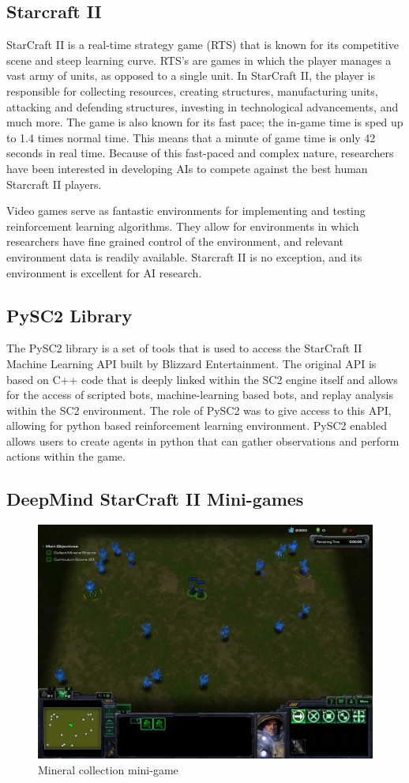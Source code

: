 \documentclass[12pt]{article}
\begin{document}
%
%
\subsection*{Starcraft II}

StarCraft II is a real-time strategy game (RTS) that is known for its competitive scene and steep learning curve.  RTS’s are games in which the player manages a vast army of units, as opposed to a single unit.  In StarCraft II, the player is responsible for collecting resources, creating structures, manufacturing units, attacking and defending structures, investing in technological advancements, and much more.  The game is also known for its fast pace; the in-game time is sped up to 1.4 times normal time.  This means that a minute of game time is only 42 seconds in real time.  Because of this fast-paced and complex nature, researchers have been interested in developing AIs to compete against the best human Starcraft II players.

Video games serve as fantastic environments for implementing and testing reinforcement learning algorithms.  They allow for environments in which researchers have fine grained control of the environment, and relevant environment data is readily available. Starcraft II is no exception, and its environment is excellent for AI research.

%
%
\subsection*{PySC2 Library}
The PySC2 library is a set of tools that is used to access the StarCraft II Machine Learning API built by Blizzard Entertainment. The original API is based on C++ code that is deeply linked within the SC2 engine itself and allows for the access of scripted bots, machine-learning based bots, and replay analysis within the SC2 environment. The role of PySC2 was to give access to this API, allowing for python based reinforcement learning environment. PySC2 enabled allows users to create agents in python that can gather observations and perform actions within the game. 

%
%
\subsection*{DeepMind StarCraft II Mini-games}

\begin{figure} [ht!]
    \centering
    \includegraphics[width=.6\textwidth, height=.3\textheight]{Game.png}
    \caption{Mineral collection mini-game}
    \label{fig:minigame}
\end{figure}
\end{document}
